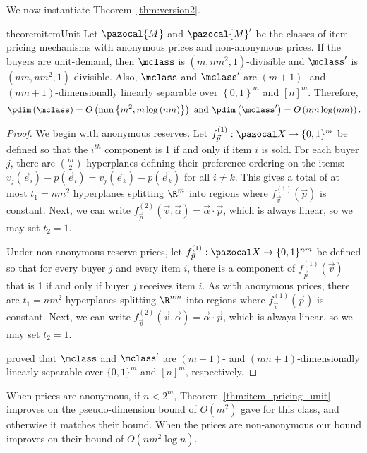 We now instantiate Theorem~\ref{thm:version2}.

\begin{restatable}{theorem}{itemUnit}\label{thm:item_pricing_unit}
Let $\pazocal{M}$ and $\pazocal{M}'$ be the classes of item-pricing mechanisms with anonymous prices and non-anonymous prices. If the buyers are unit-demand, then $\mclass$ is  $\left(m, nm^2, 1\right)$-divisible and $\mclass'$ is $\left(nm,nm^2,1\right)$-divisible. Also, $\mclass$ and $\mclass'$ are $\left(m+1\right)$- and $\left(nm+1\right)$-dimensionally linearly separable over $\left\{0,1\right\}^m$ and $[n]^m$. Therefore, \[\pdim\left(\mclass\right) = O\left(\min \left\{m^2, m\log\left(nm\right)\right\}\right) \text{ and } \pdim\left(\mclass'\right) = O\left(nm \log (nm)\right).\]
\end{restatable}

\begin{proof}
We begin with anonymous reserves. Let $f_{\vec{p}}^{(1)}: \domain \to \{0,1\}^m$ be defined so that the $i^{th}$ component is 1 if and only if item $i$ is sold. For each buyer $j$, there are ${m \choose 2}$ hyperplanes defining their preference ordering on the items: $v_j(\vec{e}_i) - p(\vec{e}_i) = v_j(\vec{e}_k) - p(\vec{e}_k)$ for all $i \not = k$. This gives a total of at most $t_1 = nm^2$ hyperplanes splitting $\R^m$ into regions where $f_{\vec{v}}^{(1)}(\vec{p})$ is constant. Next, we can write $f_{\vec{p}}^{(2)}(\vec{v}, \vec{\alpha}) = \vec{\alpha} \cdot \vec{p}$, which is always linear, so we may set $t_2 = 1$.

Under non-anonymous reserve prices, let $f_{\vec{p}}^{(1)}: \domain \to \{0,1\}^{nm}$ be defined so that for every buyer $j$ and every item $i$, there is a component of $f_{\vec{p}}^{(1)}(\vec{v})$ that is 1 if and only if buyer $j$ receives item $i$. As with anonymous prices, there are $t_1 = nm^2$ hyperplanes splitting $\R^{nm}$ into regions where $f_{\vec{v}}^{(1)}(\vec{p})$ is constant. Next, we can write $f_{\vec{p}}^{(2)}(\vec{v}, \vec{\alpha}) = \vec{\alpha} \cdot \vec{p}$, which is always linear, so we may set $t_2 = 1$.

\citet{Morgenstern16:Learning} proved that $\mclass$ and $\mclass'$ are $(m+1)$- and $(nm+1)$-dimensionally linearly separable over $\{0,1\}^m$ and $[n]^m$, respectively.
\end{proof}


When prices are anonymous, if $ n < 2^m$, Theorem~\ref{thm:item_pricing_unit} improves on the pseudo-dimension bound of $O\left(m^2\right)$ \citet{Morgenstern16:Learning} gave for this class, and otherwise it matches their bound. When the prices are non-anonymous our bound improves on their bound of $O\left(nm^2 \log n\right)$.

